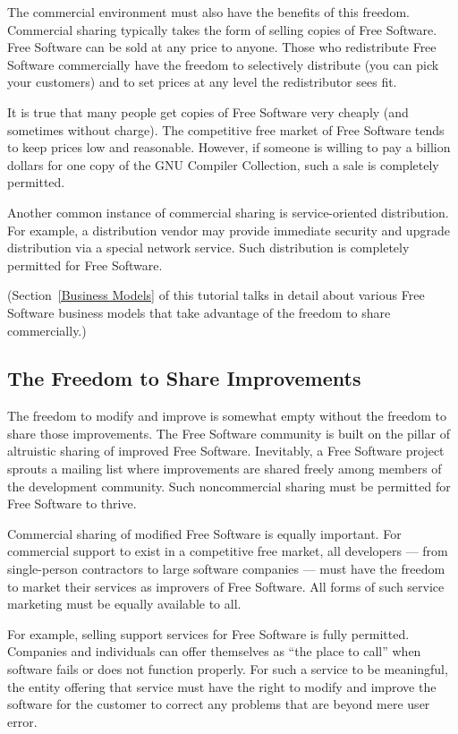 \documentclass[11pt, letterpaper]{book}
\begin{document}
The commercial environment must also have the benefits of this freedom.
Commercial sharing typically takes the form of selling copies of Free
Software. Free Software can be sold at any price to anyone. Those who
redistribute Free Software commercially have the freedom to selectively
distribute (you can pick your customers) and to set prices at any level
the redistributor sees fit.

It is true that many people get copies of Free Software very cheaply (and
sometimes without charge). The competitive free market of Free Software
tends to keep prices low and reasonable. However, if someone is willing
to pay a billion dollars for one copy of the GNU Compiler Collection, such
a sale is completely permitted.

Another common instance of commercial sharing is service-oriented
distribution. For example, a distribution vendor may provide immediate
security and upgrade distribution via a special network service. Such
distribution is completely permitted for Free Software.

(Section~\ref{Business Models} of this tutorial talks in detail about
various Free Software business models that take advantage of the freedom
to share commercially.)

\subsection{The Freedom to Share Improvements}

The freedom to modify and improve is somewhat empty without the freedom to
share those improvements. The Free Software community is built on the
pillar of altruistic sharing of improved Free Software. Inevitably, a
Free Software project sprouts a mailing list where improvements are shared
freely among members of the development community. Such noncommercial
sharing must be permitted for Free Software to thrive.

Commercial sharing of modified Free Software is equally important.
For commercial support to exist in a competitive free market, all
developers --- from single-person contractors to large software
companies --- must have the freedom to market their services as
improvers of Free Software. All forms of such service marketing must
be equally available to all.

For example, selling support services for Free Software is fully
permitted. Companies and individuals can offer themselves as ``the place
to call'' when software fails or does not function properly. For such a
service to be meaningful, the entity offering that service must have the
right to modify and improve the software for the customer to correct any
problems that are beyond mere user error.
\end{document}
